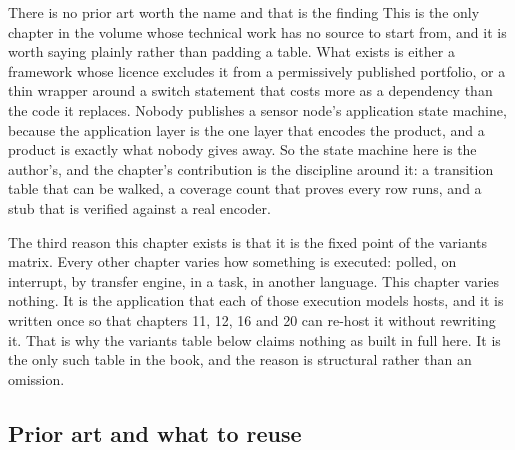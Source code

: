 \begin{note}{There is no prior art worth the name and that is the finding}
This is the only chapter in the volume whose technical work has no source to
start from, and it is worth saying plainly rather than padding a table. What
exists is either a framework whose licence excludes it from a permissively
published portfolio, or a thin wrapper around a switch statement that costs
more as a dependency than the code it replaces. Nobody publishes a sensor
node's application state machine, because the application layer is the one
layer that encodes the product, and a product is exactly what nobody gives
away. So the state machine here is the author's, and the chapter's contribution
is the discipline around it: a transition table that can be walked, a coverage
count that proves every row runs, and a stub that is verified against a real
encoder.
\end{note}

The third reason this chapter exists is that it is the fixed point of the
variants matrix. Every other chapter varies how something is executed: polled,
on interrupt, by transfer engine, in a task, in another language. This chapter
varies nothing. It is the application that each of those execution models
hosts, and it is written once so that chapters 11, 12, 16 and 20 can re-host it
without rewriting it. That is why the variants table below claims nothing as
built in full here. It is the only such table in the book, and the reason is
structural rather than an omission.

\subsection*{Prior art and what to reuse}

